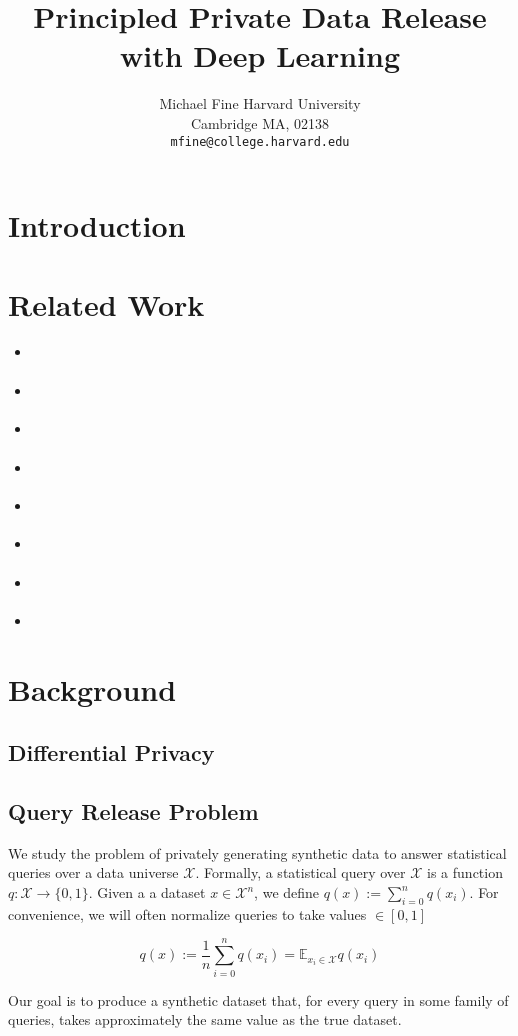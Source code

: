 \documentclass[]{article}
\author{%
  Michael Fine
  Harvard University\\
  Cambridge MA, 02138 \\
  \texttt{mfine@college.harvard.edu} 
}
\title{Principled Private Data Release with Deep Learning}
\newcommand{\X}{\mathcal{X}}
\newcommand{\B}{\{0,1\}}
\theoremstyle{definition}
\begin{document}
\maketitle

\section{Introduction}

\section{Related Work}
\begin{itemize}
    \item \cite{JY19}
    \item \cite{GLL+17}
    \item \cite{NRVW19}
    \item \cite{AGH18}
    \item \cite{NRW18}
    \item \cite{GAH+14}
    \item \cite{HLM12}
    \item \cite{GXC+18}
\end{itemize}
\section{Background}
\subsection{Differential Privacy}
\subsection{Query Release Problem}

We study the problem of privately generating synthetic data to answer statistical queries over a data universe $\X$. Formally, a statistical query over $\X$ is a function $q: \X \to \B$. Given a a dataset $x \in \X^n$, we define $q(x) := \sum_{i=0}^n q(x_i)$. For convenience, we will often normalize queries to take values $\in [0,1]$

\begin{equation}
    q(x) := \frac{1}{n}\sum_{i=0}^n q(x_i) = \mathbb{E}_{x_i \in \X} q(x_i)
\end{equation}

Our goal is to produce a synthetic dataset that, for every query in some family of queries, takes approximately the same value as the true dataset.
\end{document}
